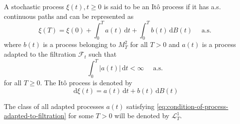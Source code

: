 \begin{definition}
    A stochastic process $\xi(t),t\geq 0$ is said to be an Itô process if it has a.s. continuous paths and can be represented as
    \begin{equation}
        \xi(T)=\xi(0)+\int_{0}^{T}a(t)\,\mathrm{d}t+\int_{0}^{T}b(t)\,\mathrm{d}B(t)\quad\text { a.s. }
    \end{equation}
    where $b(t)$ is a process belonging to $M_{T}^{2}$ for all $T>0$ and $a(t)$ is a process adapted to the filtration $\mathcal{F}_{t}$ such that
    \begin{equation}
        \int_{0}^{T}|a(t)|\,\mathrm{d}t<\infty\quad\text { a.s. } \label{eq:condition-of-process-adapted-to-filtration}
    \end{equation}
    for all $T\geq 0$.
    The Itô process is denoted by
    \begin{equation}
        \mathrm{d}\xi(t)=a(t)\,\mathrm{d}t+b(t)\,\mathrm{d}B(t)
    \end{equation}
\end{definition}

\begin{remark}
    The class of all adapted processes $a(t)$ satisfying \ref{eq:condition-of-process-adapted-to-filtration} for some $T>0$ will be denoted by $\mathcal{L}_{T}^{1}$.
\end{remark}

